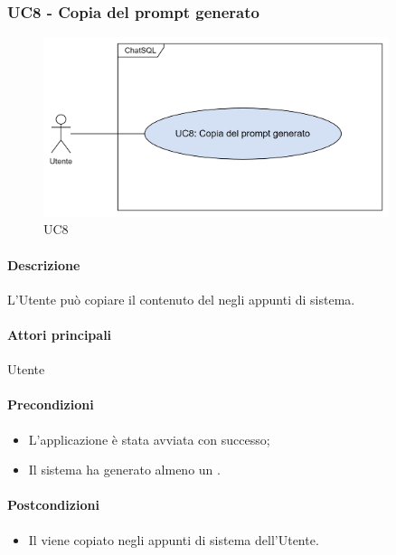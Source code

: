 \subsubsection{UC8 - Copia del prompt generato}\label{UC8}

\begin{figure}[H]
  \centering
  \includegraphics[width=0.90\textwidth]{assets/uc8.png}
  \caption{UC8}
\end{figure}

\paragraph*{Descrizione}
L'Utente può copiare il contenuto del  negli appunti di sistema.

\paragraph*{Attori principali}
Utente

\paragraph*{Precondizioni}
\begin{itemize}
  \item L'applicazione è stata avviata con successo;
  \item Il sistema ha generato almeno un .  
\end{itemize}

\paragraph*{Postcondizioni}
\begin{itemize}
  \item Il  viene copiato negli appunti di sistema dell'Utente.
\end{itemize}


